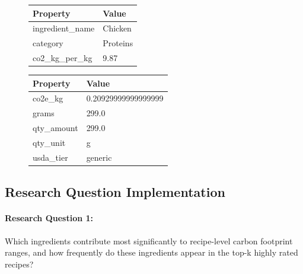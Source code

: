 \documentclass{article}
\begin{document}
\begin{figure}[H]
\begin{minipage}{0.48\textwidth}
\centering
\begin{tabular}{ll}
\hline
\textbf{Property} & \textbf{Value} \\
\hline
ingredient\_name & Chicken \\
category & Proteins \\
co2\_kg\_per\_kg & 9.87 \\
\hline
\end{tabular}
\end{minipage}
\hfill
\begin{minipage}{0.48\textwidth}
\centering
\begin{tabular}{ll}
\hline
\textbf{Property} & \textbf{Value} \\
\hline
co2e\_kg & 0.20929999999999999 \\
grams & 299.0 \\
qty\_amount & 299.0 \\
qty\_unit & g \\
usda\_tier & generic \\
\hline
\end{tabular}
\end{minipage}
\end{figure}

\subsection{Research Question Implementation}

\paragraph{Research Question 1:}Which ingredients contribute most significantly to recipe-level carbon footprint ranges, and how frequently do these ingredients appear in the top-k highly rated recipes?
\end{document}
